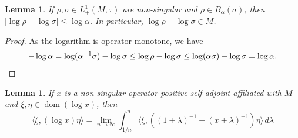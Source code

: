 \documentclass[12pt,a4paper]{amsart}
\newcommand{\1}{\mathds{1}}
\newcommand{\dom}{\operatorname{dom}}
\newcommand{\abs}[1]{\lvert#1\rvert}
\theoremstyle{plain}
\newtheorem{lemma}[proposition]{Lemma}
\theoremstyle{definition}
\theoremstyle{remark}
\begin{document}
\begin{lemma}\label{lem:diff_log_bounded}
If $\rho,\sigma\in L^1_+(M,\tau)$ are non-singular and $\rho\in B_\alpha(\sigma)$, then $\abs{\log\rho-\log\sigma}\leq\log\alpha$. In particular, $\log\rho-\log\sigma\in M$.
\end{lemma}
\begin{proof}
As the logarithm is operator monotone, we have
\begin{equation*}
-\log \alpha=\log(\alpha^{-1}\sigma)-\log \sigma\leq \log\rho-\log\sigma\leq \log(\alpha\sigma)-\log\sigma=\log\alpha.\qedhere
\end{equation*}
\end{proof}

\begin{lemma}\label{lem:integral_formula_entropy}
If $x$ is a non-singular operator  positive self-adjoint affiliated with $M$ and $\xi,\eta\in \dom(\log x)$, then
\begin{equation*}
\langle \xi,(\log x)\eta\rangle=\lim_{n\to\infty}\int_{1/n}^n \langle \xi,((1+\lambda)^{-1}-(x+\lambda)^{-1})\eta\rangle\,d\lambda
\end{equation*}
\end{lemma}
\end{document}
